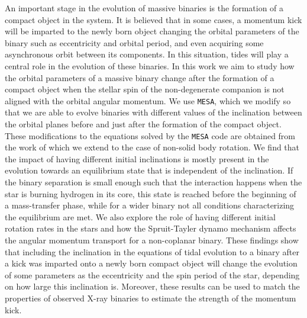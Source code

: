 \documentclass{aa}
\begin{document}
\abstract
    {An important stage in the evolution of massive binaries is the formation of a compact object in the system. It is believed that in
    some cases, a momentum kick will be imparted to the newly born object changing the orbital parameters of the binary such as
    eccentricity and orbital period, and even acquiring some asynchronous orbit between its components. In this situation, tides will play
    a central role in the evolution of these binaries.}
    {In this work we aim to study how the orbital parameters of a massive binary change after the formation of a compact object when the
    stellar spin of the non-degenerate companion is not aligned with the orbital angular momentum.}
    {We use {\tt MESA}, which we modify so that we are able to evolve binaries with different values of the inclination between the orbital
    planes before and just after the formation of the compact object. These modifications to the equations solved by the {\tt MESA} code
    are obtained from the work of \citet{repetto2014} which we extend to the case of non-solid body rotation.}
    {We find that the impact of having different initial inclinations is mostly present in the evolution towards an equilibrium state that
    is independent of the inclination. If the binary separation is small enough such that the interaction happens when the star is burning
    hydrogen in its core, this state is reached before the beginning of a mass-transfer phase, while for a wider binary not all conditions
    characterizing the equilibrium are met. We also explore the role of having different initial rotation rates in the stars and how the
    Spruit-Tayler dynamo mechanism affects the angular momentum transport for a non-coplanar binary.}
    {These findings show that including the inclination in the equations of tidal evolution to a binary after a kick was imparted onto a
    newly born compact object will change the evolution of some parameters as the eccentricity and the spin period of the star, depending
    on how large this inclination is. Moreover, these results can be used to match the properties of observed X-ray binaries to estimate
    the strength of the momentum kick.}

\end{document}
